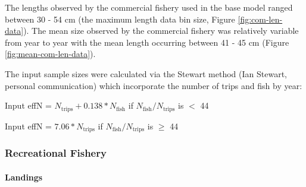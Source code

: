 \documentclass[11pt,
  english,
  a4paper,
]{article}
\begin{document}
\leavevmode\tagmcend\tagstructend\par


The lengths observed by the commercial fishery used in the base model ranged between 30 - 54 cm (the maximum length data bin size, Figure \ref{fig:com-len-data}). The mean size observed by the commercial fishery was relatively variable from year to year with the mean length occurring between 41 - 45 cm (Figure \ref{fig:mean-com-len-data}).

\leavevmode\tagmcend\tagstructend\par


The input sample sizes were calculated via the Stewart method (Ian Stewart, personal communication) which incorporate the number of trips and fish by year:

\leavevmode\tagmcend\tagstructend\par

\begin{centering}

Input effN = $N_{\text{trips}} + 0.138 * N_{\text{fish}}$ if $N_{\text{fish}}/N_{\text{trips}}$ is $<$ 44

Input effN = $7.06 * N_{\text{trips}}$ if $N_{\text{fish}}/N_{\text{trips}}$ is $\geq$ 44

\end{centering}


\hypertarget{recreational-fishery}{%
\subsubsection{Recreational Fishery}\label{recreational-fishery}}

\leavevmode\tagmcend\tagstructend


\hypertarget{landings-1}{%
\paragraph{Landings}\label{landings-1}}

\leavevmode\tagmcend\tagstructend

\vspace{0.25cm}

\end{document}
